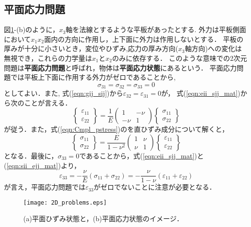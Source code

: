 \documentclass[10pt,a4j]{jbook}
\begin{document}
\subsection{平面応力問題}
図\ref{fig:fig6_2}-(b)のように，$x_3$軸を法線とするような平板があったとする.
外力は平板側面において$x_1x_2$面内の方向に作用し，上下面に外力は作用しないとする．
平板の厚みが十分に小さいとき，変位やひずみ,応力の厚み方向($x_3$軸方向)への変化は
無視でき，これらの力学量は$x_1$と$x_2$のみに依存する．
このような意味での2次元問題は{\bf 平面応力問題}と呼ばれ，物体は{\bf 平面応力状態}にあるという．
平面応力問題では平板上下面に作用する外力がゼロであることから, 
\begin{equation}
 \sigma_{31}=\sigma_{32}=\sigma_{33}=0
\end{equation}
としてよい．また, 式(\ref{eqn:gij_sij})から$\varepsilon_{32}=\varepsilon_{31}=0$が，
式(\ref{eqn:eii_sjj_mat})から次のことが言える．
\begin{equation}
	\left\{ 
	\begin{array}{*{20}{c}}
	\varepsilon _{11}\\
	\varepsilon _{22}
	\end{array}
	\right\} 
	= 
	\frac{1}{E}\left( 
	\begin{array}{*{20}{c}}
	1& - \nu \\
	 - \nu &1
	\end{array}
	\right)
	\left\{ 
	\begin{array}{*{20}{c}}
	\sigma _{11}\\
	\sigma _{22}
	\end{array} 
	\right\}
	\label{eqn:Cmpl_pstress}
\end{equation}
が従う．また，式(\ref{eqn:Cmpl_pstress})のを直ひずみ成分について解くと，
\begin{equation}
	\left\{ 
	\begin{array}{*{20}{c}}
	\sigma _{11}\\
	\sigma _{22}
	\end{array}
	\right\} 
	= 
	\frac{E}{1-\nu^2}\left( 
	\begin{array}{*{20}{c}}
	1&  \nu \\
	  \nu &1
	\end{array}
	\right)
	\left\{ 
	\begin{array}{*{20}{c}}
	\varepsilon _{11}\\
	\varepsilon _{22}
	\end{array} 
	\right\}
	\label{eqn:Hooke_pstress}
\end{equation}
となる．最後に，$\sigma_{33}=0$であることから，式(\ref{eqn:eii_sjj_mat})と(\ref{eqn:sii_ejj_mat})より，
\begin{equation}
	\varepsilon_{33}=-\frac{\nu}{E} \left( \sigma_{11}+\sigma_{22} \right)
	= -\frac{\nu}{1-\nu}\left(\varepsilon_{11}+\varepsilon_{22}\right)
\end{equation}
が言え，平面応力問題では$\varepsilon_{33}$がゼロでないことに注意が必要となる．
\begin{figure}[h]
	\begin{center}
	\texttt{[image: 2D\_problems.eps]} 
	\end{center}
	\caption{
	(a)平面ひずみ状態と，(b)平面応力状態のイメージ．
	 } 
	\label{fig:fig6_2}
\end{figure}
\end{document}

